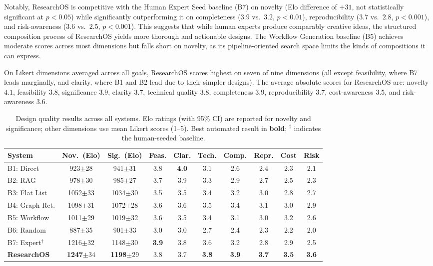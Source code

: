 Notably, ResearchOS is competitive with the Human Expert Seed baseline (B7) on novelty (Elo difference of $+31$, not statistically significant at $p < 0.05$) while significantly outperforming it on completeness ($3.9$ vs.\ $3.2$, $p < 0.01$), reproducibility ($3.7$ vs.\ $2.8$, $p < 0.001$), and risk-awareness ($3.6$ vs.\ $2.5$, $p < 0.001$). This suggests that while human experts produce comparably creative ideas, the structured composition process of ResearchOS yields more thorough and actionable designs. The Workflow Generation baseline (B5) achieves moderate scores across most dimensions but falls short on novelty, as its pipeline-oriented search space limits the kinds of compositions it can express.

On Likert dimensions averaged across all goals, ResearchOS scores highest on seven of nine dimensions (all except feasibility, where B7 leads marginally, and clarity, where B1 and B2 lead due to their simpler designs). The average absolute scores for ResearchOS are: novelty $4.1$, feasibility $3.8$, significance $3.9$, clarity $3.7$, technical quality $3.8$, completeness $3.9$, reproducibility $3.7$, cost-awareness $3.5$, and risk-awareness $3.6$.

\begin{table}[t]
\centering
\caption{Design quality results across all systems. Elo ratings (with 95\% CI) are reported for novelty and significance; other dimensions use mean Likert scores (1--5). Best automated result in \textbf{bold}; $^\dagger$ indicates the human-seeded baseline.}
\label{tab:design_quality}
\small
\begin{tabular}{@{}l cc ccccccc@{}}
\toprule
\textbf{System} & \textbf{Nov.\ (Elo)} & \textbf{Sig.\ (Elo)} & \textbf{Feas.} & \textbf{Clar.} & \textbf{Tech.} & \textbf{Comp.} & \textbf{Repr.} & \textbf{Cost} & \textbf{Risk} \\
\midrule
B1: Direct & 923\tiny{$\pm$28} & 941\tiny{$\pm$31} & 3.8 & \textbf{4.0} & 3.1 & 2.6 & 2.4 & 2.3 & 2.1 \\
B2: RAG & 978\tiny{$\pm$30} & 985\tiny{$\pm$27} & 3.7 & 3.9 & 3.3 & 2.9 & 2.7 & 2.5 & 2.3 \\
B3: Flat List & 1052\tiny{$\pm$33} & 1034\tiny{$\pm$30} & 3.5 & 3.5 & 3.4 & 3.2 & 3.0 & 2.8 & 2.7 \\
B4: Graph Ret. & 1098\tiny{$\pm$31} & 1072\tiny{$\pm$28} & 3.6 & 3.6 & 3.5 & 3.4 & 3.1 & 3.0 & 2.9 \\
B5: Workflow & 1011\tiny{$\pm$29} & 1019\tiny{$\pm$32} & 3.6 & 3.5 & 3.4 & 3.1 & 3.0 & 3.2 & 2.6 \\
B6: Random & 887\tiny{$\pm$35} & 901\tiny{$\pm$33} & 3.0 & 3.0 & 2.7 & 2.4 & 2.3 & 2.2 & 2.0 \\
B7: Expert$^\dagger$ & 1216\tiny{$\pm$32} & 1148\tiny{$\pm$30} & \textbf{3.9} & 3.8 & 3.6 & 3.2 & 2.8 & 2.9 & 2.5 \\
\midrule
\textbf{ResearchOS} & \textbf{1247}\tiny{$\pm$34} & \textbf{1198}\tiny{$\pm$29} & 3.8 & 3.7 & \textbf{3.8} & \textbf{3.9} & \textbf{3.7} & \textbf{3.5} & \textbf{3.6} \\
\bottomrule
\end{tabular}
\end{table}


